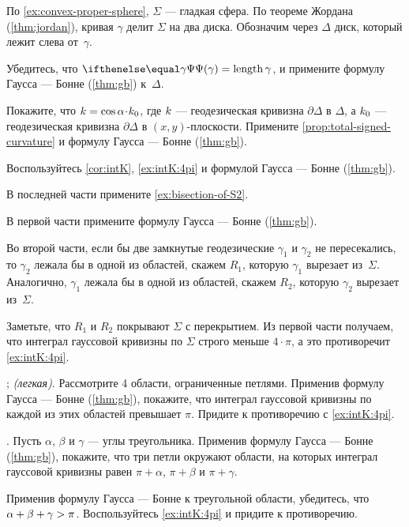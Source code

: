 \begin{multicols}{2}
\setcounter{eqtn}{0}

По \ref{ex:convex-proper-sphere}, $\Sigma$ --- гладкая сфера.
По теореме Жордана (\ref{thm:jordan}), кривая $\gamma$ делит $\Sigma$ на два диска.
Обозначим через $\Delta$ диск, который лежит слева от~$\gamma$.

Убедитесь, что $\tgc\gamma=\length\gamma$, и примените формулу Гаусса --- Бонне (\ref{thm:gb}) к~$\Delta$.

Покажите, что $\skur=\cos\alpha\cdot\skur_0$,
где $k$ --- геодезическая кривизна $\partial \Delta$ в $\Delta$,
а $k_0$ --- геодезическая кривизна $\partial \Delta$ в $(x,y)$-плоскости.
Примените \ref{prop:total-signed-curvature} и формулу Гаусса --- Бонне (\ref{thm:gb}).

Воспользуйтесь \ref{cor:intK}, \ref{ex:intK:4pi} и формулой Гаусса --- Бонне (\ref{thm:gb}).

В последней части примените \ref{ex:bisection-of-S2}.

В первой части примените формулу Гаусса --- Бонне (\ref{thm:gb}).

Во второй части, если бы две замкнутые геодезические $\gamma_1$ и $\gamma_2$ не пересекались, то 
$\gamma_2$ лежала бы в одной из областей, скажем $R_1$, которую $\gamma_1$ вырезает из~$\Sigma$.
Аналогично, $\gamma_1$ лежала бы в одной из областей, скажем $R_2$, которую $\gamma_2$ вырезает из~$\Sigma$.

Заметьте, что $R_1$ и $R_2$ покрывают $\Sigma$ с перекрытием.
Из первой части получаем, что интеграл гауссовой кривизны по $\Sigma$ строго меньше $4\cdot\pi$, а это противоречит \ref{ex:intK:4pi}.

\parbf{\ref{ex:self-intersections}}; \textit{(легкая)}.
Рассмотрите 4 области, ограниченные петлями.
Применив формулу Гаусса --- Бонне (\ref{thm:gb}), покажите, что интеграл гауссовой кривизны по каждой из этих областей превышает $\pi$.
Придите к противоречию с \ref{ex:intK:4pi}.

.
Пусть $\alpha$, $\beta$ и $\gamma$ --- углы треугольника.
Применив формулу Гаусса --- Бонне (\ref{thm:gb}), покажите, что три петли окружают области, на которых интеграл гауссовой кривизны равен $\pi+\alpha$, $\pi+\beta$ и $\pi+\gamma$.

Применив формулу Гаусса --- Бонне к треугольной области, убедитесь, что $\alpha+\beta\z+\gamma>\pi$.
Воспользуйтесь \ref{ex:intK:4pi} и придите к противоречию.


\end{multicols}
